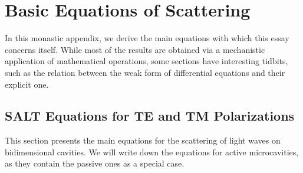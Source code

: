 \chapter{Basic Equations of Scattering}\label{app:basicEquations}
In this monastic appendix, we derive the main equations with which
this essay concerns itself. While most of the results are
obtained via a mechanistic application of mathematical operations, 
some sections have interesting tidbits, such as the relation
between the weak form of differential equations and their 
explicit one.

\section{SALT Equations for TE and TM Polarizations}
This section presents the main equations for the scattering
of light waves on bidimensional cavities. We will write
down the equations for active microcavities, as they contain
the passive ones as a special case. 

